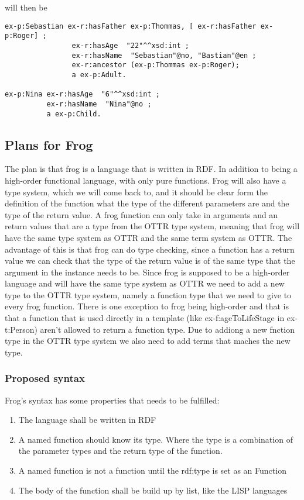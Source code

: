 will then be
\begin{lstlisting}[frame=single, language=turtle]
ex-p:Sebastian ex-r:hasFather ex-p:Thommas, [ ex-r:hasFather ex-p:Roger] ; 
                ex-r:hasAge  "22"^^xsd:int ; 
                ex-r:hasName  "Sebastian"@no, "Bastian"@en ;
                ex-r:ancestor (ex-p:Thommas ex-p:Roger);
                a ex-p:Adult.

ex-p:Nina ex-r:hasAge  "6"^^xsd:int ; 
          ex-r:hasName  "Nina"@no ;
          a ex-p:Child.
\end{lstlisting}

\subsection{Plans for Frog}
The plan is that frog is a language that is written in RDF. In addition to being a high-order functional language, 
with only pure functions. 
Frog will also have a type system, which we will come back to, and it should be clear form the definition of 
the function what the type of the different parameters are and the type of the return value. 
A frog function can only take in arguments and an return values that are a type from the OTTR type system, 
meaning that frog will have the same type system as OTTR and the same term system as OTTR.
The advantage of this is that frog can do type checking, since a function has a return value we can check that 
the type of the return value is of the same type that the argument in the instance needs to be.
Since frog is supposed to be a high-order language and will have the same type system as OTTR  
we need to add a new type to the OTTR type system, namely a function type that we need to give to every frog function. 
There is one exception to frog being high-order and that is that a function that is used directly in a 
template (like ex-f:ageToLifeStage in ex-t:Person) aren't allowed to return a function type. Due to addiong a new 
fnction type in the OTTR type system we also need to add terms that maches the new type. 

\subsubsection{Proposed syntax}
Frog's syntax has some properties that needs to be fulfilled: 
\begin{enumerate}
    \item The language shall be written in RDF 
    \item A named function should know its type. Where the type is a combination of the parameter types 
    and the return type of the function.
    \item A named function is not a function until the rdf:type is set as an Function
    \item The body of the function shall be build up by list, like the LISP languages
\end{enumerate}

